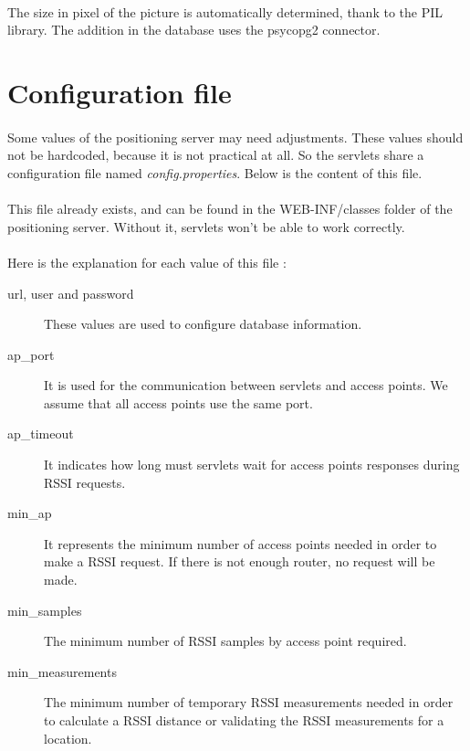 

\paragraph{}
The size in pixel of the picture is automatically determined, thank to the PIL
library. The addition in the database uses the psycopg2 connector.

    \section{Configuration file}

\paragraph{}
Some values of the positioning server may need adjustments. These values should
not be hardcoded, because it is not practical at all. So the servlets share a
configuration file named \emph{config.properties}. Below is the content of this
file.



\paragraph{}
This file already exists, and can be found in the WEB-INF/classes folder of the
positioning server. Without it, servlets won't be able to work correctly.

\paragraph{}
Here is the explanation for each value of this file :
\begin{description}
    \item[url, user and password] These values are used to configure database
        information.
    \item[ap\_port] It is used for the communication between servlets and access
        points. We assume that all access points use the same port.
    \item[ap\_timeout] It indicates how long must servlets wait for access points
        responses during RSSI requests.
    \item[min\_ap] It represents the minimum number of access points needed in
        order to make a RSSI request. If there is not enough router, no request
        will be made.
    \item[min\_samples] The minimum number of RSSI samples by access point
        required.
    \item[min\_measurements] The minimum number of temporary RSSI measurements
        needed in order to calculate a RSSI distance or validating the RSSI
        measurements for a location.
\end{description}
